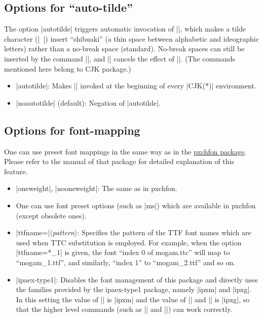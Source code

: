 \documentclass[a4paper]{article}
\newcommand{\Pkg}[1]{\textsf{#1}}
\newcommand{\Meta}[1]{$\langle$\textit{#1}$\rangle$}
\newcommand{\Means}{:\hspace{1em plus 1em}}
\begin{document}
\subsection{Options for ``auto-tilde''}

The option |autotilde| triggers automatic invocation of |\CJKtilde|,
which makes a tilde character (|~|) insert ``shibuaki'' (a thin space
between alphabetic and ideographic letters) rather than a no-break space
(standard).
No-break spaces can still be inserted by the command |\nbs|, and
|\standardtilde| cancels the effect of |\CJKtilde|.
(The commands mentioned here belong to \Pkg{CJK} package.)

\begin{itemize}
\item |autotilde|\Means
  Makes |\CJKtilde| invoked at the beginning of every |CJK(*)|
  environment.
\item |noautotilde| (default)\Means
  Negation of |autotilde|.
\end{itemize}

\subsection{Options for font-mapping}

One can use preset font mappings in the same way as in the
\href{http://www.ctan.org/pkg/pxchfon}{\Pkg{pxchfon} package}.
Please refer to the manual of that package for detailed explanation
of this feature.

\begin{itemize}
\item |oneweight|, |nooneweight|\Means
  The same as in \Pkg{pxchfon}.
\item One can use font preset options (such as |ms|) which are available
  in \Pkg{pxchfon} (except obsolete ones).
\item |ttfname=|\Meta{pattern}\Means
  Specifies the pattern of the TTF font names which are used when TTC
  substitution is employed.
  For example, when the option |ttfname=*_1| is given, the font
  ``index 0 of mogam.ttc'' will map to ``mogam\_1.ttf'', and similarly,
  ``index 1'' to ``mogam\_2.ttf'' and so on.
\item |ipaex-type1|\Means
  Disables the font management of this package and directly uses the
  families provided by the ipaex-type1 package, namely |ipxm| and |ipxg|.
  In this setting the value of |\mcdefault| is |ipxm| and the value of
  |\gtdefault| and |\mgdefault| is |ipxg|, so that the higher level
  commands (such as |\sffamily| and |\gtfamily|) can work correctly.
\end{itemize}
\end{document}

